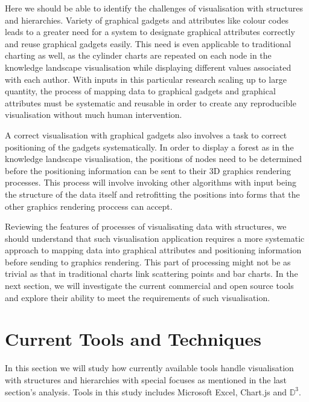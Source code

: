 \documentclass[11pt, a4paper]{report}
\begin{document}
Here we should be able to identify the challenges of visualisation with structures and hierarchies. Variety of graphical gadgets and attributes like colour codes leads to a greater need for a system to designate graphical attributes correctly and reuse graphical gadgets easily. This need is even applicable to traditional charting as well, as the cylinder charts are repeated on each node in the knowledge landscape visualisation while displaying different values associated with each author. With inputs in this particular research scaling up to large quantity, the process of mapping data to graphical gadgets and graphical attributes must be systematic and reusable in order to create any reproducible visualisation without much human intervention.

A correct visualisation with graphical gadgets also involves a task to correct positioning of the gadgets systematically. In order to display a forest as in the knowledge landscape visualisation, the positions of nodes need to be determined before the positioning information can be sent to their 3D graphics rendering processes. This process will involve invoking other algorithms with input being the structure of the data itself and retrofitting the positions into forms that the other graphics rendering proccess can accept.

Reviewing the features of processes of visualisating data with structures, we should understand that such visualisation application requires a more systematic approach to mapping data into graphical attributes and positioning information before sending to graphics rendering. This part of processing might not be as trivial as that in traditional charts link scattering points and bar charts. In the next section, we will investigate the current commercial and open source tools and explore their ability to meet the requirements of such visualisation.

\section{Current Tools and Techniques}
In this section we will study how currently available tools handle visualisation with structures and hierarchies with special focuses as mentioned in the last section's analysis. Tools in this study includes Microsoft Excel, Chart.js and $\mathbb D^3$.
\end{document}
